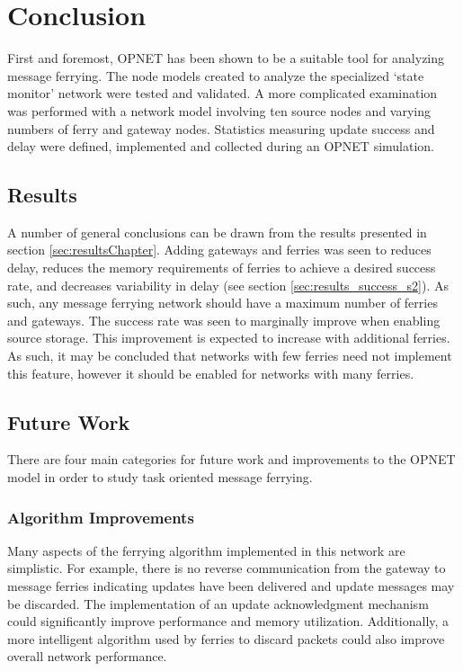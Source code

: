 \chapter{Conclusion} 

First and foremost, OPNET has been shown to be a suitable tool for analyzing message ferrying.
The node models created to analyze the specialized \lq{}state monitor\rq{} network were tested and validated.
A more complicated examination was performed with a network model involving ten source nodes and varying numbers of ferry and gateway nodes.
Statistics measuring update success and delay were defined, implemented and collected during an OPNET simulation.

\section{Results}

A number of general conclusions can be drawn from the results presented in section \ref{sec:resultsChapter}.
Adding gateways and ferries was seen to reduces delay, reduces the memory requirements of ferries to achieve a desired success rate, and decreases variability in delay (see section \ref{sec:results_success_s2}).
As such, any message ferrying network should have a maximum number of ferries and gateways.
The success rate was seen to marginally improve when enabling source storage.
This improvement is expected to increase with additional ferries.
As such, it may be concluded that networks with few ferries need not implement this feature, however it should be enabled for networks with many ferries.

\section{Future Work}

There are four main categories for future work and improvements to the OPNET model in order to study task oriented message ferrying.

\subsection{Algorithm Improvements}

Many aspects of the ferrying algorithm implemented in this network are simplistic.
For example, there is no reverse communication from the gateway to message ferries indicating updates have been delivered and update messages may be discarded.
The implementation of an update acknowledgment mechanism could significantly improve performance and memory utilization.
Additionally, a more intelligent algorithm used by ferries to discard packets could also improve overall network performance.

